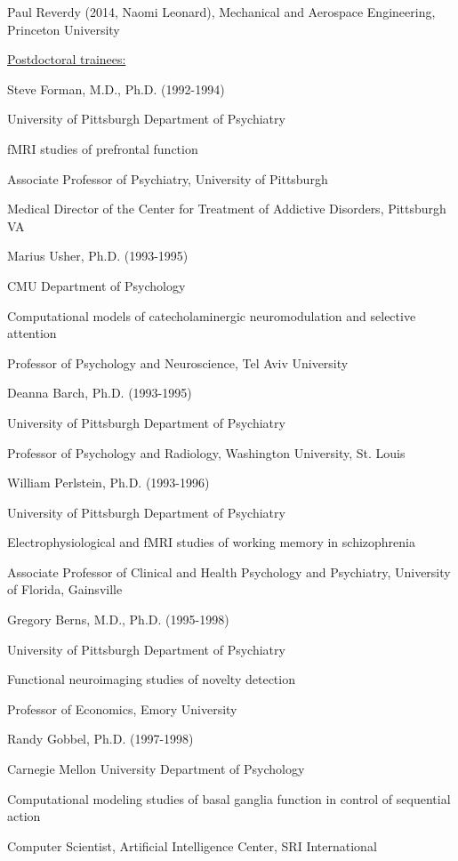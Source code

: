 \documentclass[10 pt]{article}
\begin{document}
Paul Reverdy (2014, Naomi Leonard), Mechanical and Aerospace Engineering, Princeton University
    \bigskip


{\fontsize{13pt}{16 pt}\selectfont \underline{Postdoctoral trainees:}}
    \smallskip

Steve Forman, M.D., Ph.D. (1992-1994)

University of Pittsburgh Department of Psychiatry

fMRI studies of prefrontal function

Associate Professor of Psychiatry, University of Pittsburgh

Medical Director of the Center for Treatment of Addictive Disorders, Pittsburgh VA
    \medskip

Marius Usher, Ph.D. (1993-1995)

CMU Department of Psychology

Computational models of catecholaminergic neuromodulation and selective attention

Professor of Psychology and Neuroscience, Tel Aviv University
    \medskip

Deanna Barch, Ph.D. (1993-1995)

University of Pittsburgh Department of Psychiatry

Professor of Psychology and Radiology, Washington University, St. Louis
    \medskip

William Perlstein, Ph.D. (1993-1996)

University of Pittsburgh Department of Psychiatry

Electrophysiological and fMRI studies of working memory in schizophrenia

Associate Professor of Clinical and Health Psychology and Psychiatry, University of Florida, Gainsville
    \medskip

Gregory Berns, M.D., Ph.D. (1995-1998)

University of Pittsburgh Department of Psychiatry

Functional neuroimaging studies of novelty detection

Professor of Economics, Emory University
    \medskip

Randy Gobbel, Ph.D. (1997-1998)

Carnegie Mellon University Department of Psychology

Computational modeling studies of basal ganglia function in control of sequential action

Computer Scientist, Artificial Intelligence Center, SRI International
    \medskip
\end{document}
